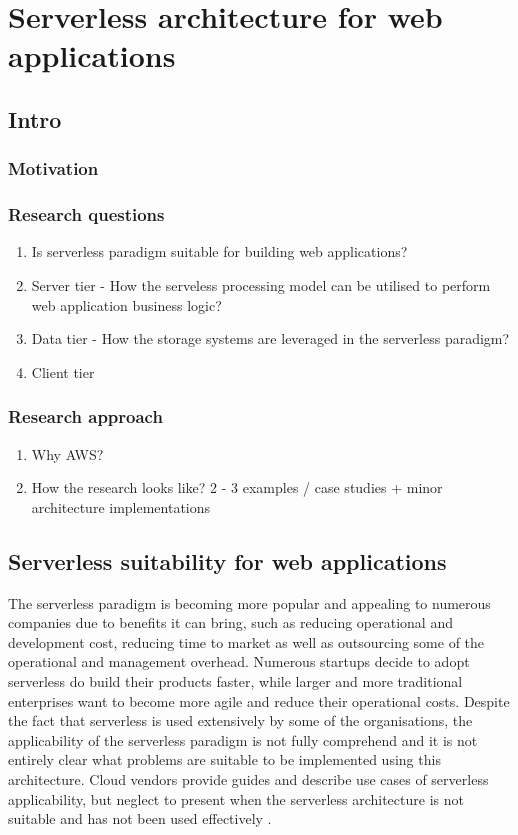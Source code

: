 \chapter{Serverless architecture for web applications}

\section{Intro}

\subsection{Motivation}

\subsection{Research questions}

\begin{enumerate}
    \item Is serverless paradigm suitable for building web applications?
    \item Server tier - How the serveless processing model can be utilised to perform web application business logic?
    \item Data tier - How the storage systems are leveraged in the serverless paradigm?
    \item Client tier
\end{enumerate}

\subsection{Research approach}

\begin{enumerate}
    \item Why AWS?
    \item How the research looks like? 2 - 3 examples / case studies + minor architecture implementations
\end{enumerate}

\section{Serverless suitability for web applications}

The serverless paradigm is becoming more popular and appealing to numerous companies due to benefits it can bring, such as reducing operational and development cost, reducing time to market as well as outsourcing some of the operational and management overhead.
Numerous startups decide to adopt serverless do build their products faster, while larger and more traditional enterprises want to become more agile and reduce their operational costs.
Despite the fact that serverless is used extensively by some of the organisations, the applicability of the serverless paradigm is not fully comprehend and it is not entirely clear what problems are suitable to be implemented using this architecture.
Cloud vendors provide guides and describe use cases of serverless applicability, but neglect to present when the serverless architecture is not suitable and has not been used effectively \cite{EvaluationOfServerlessApplicationProgrammingModel}.

